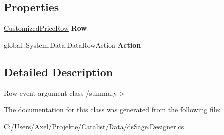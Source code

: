 \subsection*{Properties}
\begin{DoxyCompactItemize}
\item 
\hyperlink{class_products_1_1_data_1_1ds_sage_1_1_customized_price_row}{Customized\+Price\+Row} {\bfseries Row}\hypertarget{class_products_1_1_data_1_1ds_sage_1_1_customized_price_row_change_event_ab6654b6c0ffb96b7e5f0951619a81b07}{}\label{class_products_1_1_data_1_1ds_sage_1_1_customized_price_row_change_event_ab6654b6c0ffb96b7e5f0951619a81b07}

\item 
global\+::\+System.\+Data.\+Data\+Row\+Action {\bfseries Action}\hypertarget{class_products_1_1_data_1_1ds_sage_1_1_customized_price_row_change_event_a6b4463405b72a7979221783dc11ba00c}{}\label{class_products_1_1_data_1_1ds_sage_1_1_customized_price_row_change_event_a6b4463405b72a7979221783dc11ba00c}

\end{DoxyCompactItemize}


\subsection{Detailed Description}
Row event argument class /summary$>$ 

The documentation for this class was generated from the following file\+:\begin{DoxyCompactItemize}
\item 
C\+:/\+Users/\+Axel/\+Projekte/\+Catalist/\+Data/ds\+Sage.\+Designer.\+cs\end{DoxyCompactItemize}
